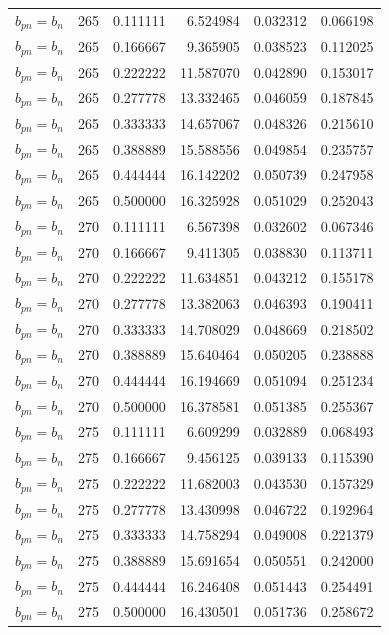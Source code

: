 \begin{longtable}{l r r r r r}
$b_{pn} = b_n$ & 265 & 0.111111 & 6.524984 & 0.032312 & 0.066198 \\
$b_{pn} = b_n$ & 265 & 0.166667 & 9.365905 & 0.038523 & 0.112025 \\
$b_{pn} = b_n$ & 265 & 0.222222 & 11.587070 & 0.042890 & 0.153017 \\
$b_{pn} = b_n$ & 265 & 0.277778 & 13.332465 & 0.046059 & 0.187845 \\
$b_{pn} = b_n$ & 265 & 0.333333 & 14.657067 & 0.048326 & 0.215610 \\
$b_{pn} = b_n$ & 265 & 0.388889 & 15.588556 & 0.049854 & 0.235757 \\
$b_{pn} = b_n$ & 265 & 0.444444 & 16.142202 & 0.050739 & 0.247958 \\
$b_{pn} = b_n$ & 265 & 0.500000 & 16.325928 & 0.051029 & 0.252043 \\
$b_{pn} = b_n$ & 270 & 0.111111 & 6.567398 & 0.032602 & 0.067346 \\
$b_{pn} = b_n$ & 270 & 0.166667 & 9.411305 & 0.038830 & 0.113711 \\
$b_{pn} = b_n$ & 270 & 0.222222 & 11.634851 & 0.043212 & 0.155178 \\
$b_{pn} = b_n$ & 270 & 0.277778 & 13.382063 & 0.046393 & 0.190411 \\
$b_{pn} = b_n$ & 270 & 0.333333 & 14.708029 & 0.048669 & 0.218502 \\
$b_{pn} = b_n$ & 270 & 0.388889 & 15.640464 & 0.050205 & 0.238888 \\
$b_{pn} = b_n$ & 270 & 0.444444 & 16.194669 & 0.051094 & 0.251234 \\
$b_{pn} = b_n$ & 270 & 0.500000 & 16.378581 & 0.051385 & 0.255367 \\
$b_{pn} = b_n$ & 275 & 0.111111 & 6.609299 & 0.032889 & 0.068493 \\
$b_{pn} = b_n$ & 275 & 0.166667 & 9.456125 & 0.039133 & 0.115390 \\
$b_{pn} = b_n$ & 275 & 0.222222 & 11.682003 & 0.043530 & 0.157329 \\
$b_{pn} = b_n$ & 275 & 0.277778 & 13.430998 & 0.046722 & 0.192964 \\
$b_{pn} = b_n$ & 275 & 0.333333 & 14.758294 & 0.049008 & 0.221379 \\
$b_{pn} = b_n$ & 275 & 0.388889 & 15.691654 & 0.050551 & 0.242000 \\
$b_{pn} = b_n$ & 275 & 0.444444 & 16.246408 & 0.051443 & 0.254491 \\
$b_{pn} = b_n$ & 275 & 0.500000 & 16.430501 & 0.051736 & 0.258672 \\

\end{longtable}
